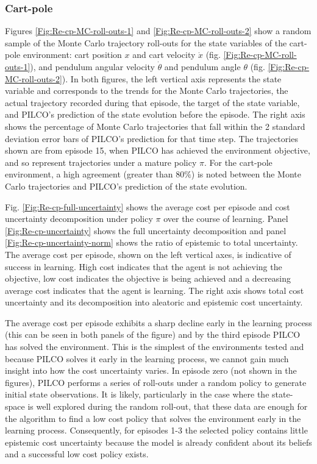 \subsubsection{Cart-pole}
Figures \ref{Fig:Re-cp-MC-roll-outs-1} and \ref{Fig:Re-cp-MC-roll-outs-2} show a random sample of the Monte Carlo trajectory roll-outs for the state variables of the cart-pole environment: cart position $x$ and cart velocity $\dot{x}$ (fig. \ref{Fig:Re-cp-MC-roll-outs-1}), and pendulum angular velocity $\dot \theta$ and pendulum angle $\theta$ (fig. \ref{Fig:Re-cp-MC-roll-outs-2}). In both figures, the left vertical axis represents the state variable and corresponds to the trends for the Monte Carlo trajectories, the actual trajectory recorded during that episode, the target of the state variable, and PILCO's prediction of the state evolution before the episode. The right axis shows the percentage of Monte Carlo trajectories that fall within the 2 standard deviation error bars of PILCO's prediction for that time step. The trajectories shown are from episode 15, when PILCO has achieved the environment objective, and so represent trajectories under a mature policy $\pi$. For the cart-pole environment, a high agreement (greater than $80\%$) is noted between the Monte Carlo trajectories and PILCO's prediction of the state evolution.

Fig. \ref{Fig:Re-cp-full-uncertainty} shows the average cost per episode and cost uncertainty decomposition under policy $\pi$ over the course of learning. Panel \ref{Fig:Re-cp-uncertainty} shows the full uncertainty decomposition and panel \ref{Fig:Re-cp-uncertainty-norm} shows the ratio of epistemic to total uncertainty. The average cost per episode, shown on the left vertical axes, is indicative of success in learning. High cost indicates that the agent is not achieving the objective, low cost indicates the objective is being achieved and a decreasing average cost indicates that the agent is learning. The right axis shows total cost uncertainty and its decomposition into aleatoric and epistemic cost uncertainty. 

The average cost per episode exhibits a sharp decline early in the learning process (this can be seen in both panels of the figure) and by the third episode PILCO has solved the environment. This is the simplest of the environments tested and because PILCO solves it early in the learning process, we cannot gain much insight into how the cost uncertainty varies. In episode zero (not shown in the figures), PILCO performs a series of roll-outs under a random policy to generate initial state observations. It is likely, particularly in the case where the state-space is well explored during the random roll-out, that these data are enough for the algorithm to find a low cost policy that solves the environment early in the learning process. Consequently, for episodes 1-3 the selected policy contains little epistemic cost uncertainty because the model is already confident about its beliefs and a successful low cost policy exists. 

